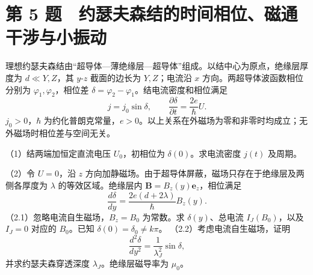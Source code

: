 \documentclass[12pt,a4paper,fontset=fandol]{ctexart}
\begin{document}
\clearpage

\section{第 5
题　约瑟夫森结的时间相位、磁通干涉与小振动}\label{ux7b2c-5-ux9898-ux7ea6ux745fux592bux68eeux7ed3ux7684ux65f6ux95f4ux76f8ux4f4dux78c1ux901aux5e72ux6d89ux4e0eux5c0fux632fux52a8}

理想约瑟夫森结由``超导体---薄绝缘层---超导体''组成。以结中心为原点，绝缘层厚度为
\(d\ll Y,Z\)，其 \(y\)-\(z\) 截面的边长为 \(Y,Z\)；电流沿 \(x\)
方向。两超导体波函数相位分别为 \(\varphi_1,\varphi_2\)，相位差
\(\delta=\varphi_2-\varphi_1\)。结电流密度和相位满足 \[
j=j_0\sin\delta,\qquad
\frac{\partial\delta}{\partial t}=\frac{2e}{\hbar}U.
\] \(j_0>0\)，\(\hbar\)
为约化普朗克常量，\(e>0\)。以上关系在外磁场为零和非零时均成立；无外磁场时相位差与空间无关。

\begin{center}
\begin{minipage}{\linewidth}
\centering\begingroup
{}
\ifdim\wd\diagrambox>.88\linewidth
\sbox{\diagrambox}{\resizebox{.88\linewidth}{!}{\usebox{\diagrambox}}}
\fi
\ifdim\ht\diagrambox>.40\textheight
\resizebox{!}{.40\textheight}{\usebox{\diagrambox}}
\else\usebox{\diagrambox}\fi
\par{}
\endgroup\end{minipage}
\end{center}

（1）结两端加恒定直流电压 \(U_0\)，初相位为 \(\delta(0)\)。求电流密度
\(j(t)\) 及周期。

（2）令 \(U=0\)，沿 \(z\)
方向加静磁场。由于超导体屏蔽，磁场只存在于绝缘层及两侧各厚度为
\(\lambda\) 的等效区域。绝缘层内
\(\mathbf B=B_z(y)\mathbf e_z\)，相位满足 \[
\frac{d\delta}{dy}=\frac{2e(d+2\lambda)}{\hbar}B_z(y).
\] （2.1）忽略电流自生磁场，\(B_z=B_0\) 为常数。求 \(\delta(y)\)、总电流
\(I_J(B_0)\)，以及 \(I_J=0\) 对应的 \(B_0\)。已知
\(\delta(0)=\delta_0\ne k\pi\)。 （2.2）考虑电流自生磁场，证明 \[
\frac{d^2\delta}{dy^2}=\frac1{\lambda_J^2}\sin\delta,
\] 并求约瑟夫森穿透深度 \(\lambda_J\)。绝缘层磁导率为 \(\mu_0\)。
\end{document}
